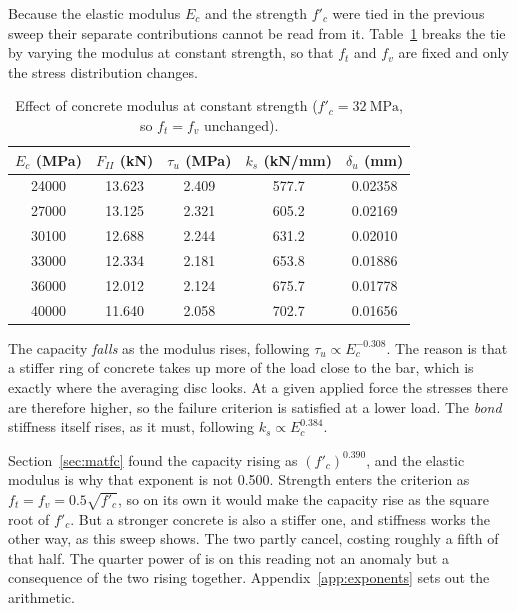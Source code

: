 Because the elastic modulus $E_c$ and the strength $f'_c$ were tied in the
previous sweep their separate contributions cannot be read from it.
Table~\ref{tab:sweepEc} breaks the tie by varying the modulus at constant
strength, so that $f_t$ and $f_v$ are fixed and only the stress
distribution changes.

\begin{table}[H]
\centering
\caption{Effect of concrete modulus at constant strength
         ($f'_c = \SI{32}{\mega\pascal}$, so $f_t = f_v$ unchanged).}
\label{tab:sweepEc}
\small
\begin{tabular*}{\linewidth}{@{\extracolsep{\fill}}ccccc@{}}
\hline
$E_c$ (MPa) & $F_{II}$ (kN) & $\tau_u$ (MPa) & $k_s$ (kN/mm) & $\delta_u$ (mm) \\
\hline
24000 & 13.623 & 2.409 & 577.7 & 0.02358 \\
27000 & 13.125 & 2.321 & 605.2 & 0.02169 \\
30100 & 12.688 & 2.244 & 631.2 & 0.02010 \\
33000 & 12.334 & 2.181 & 653.8 & 0.01886 \\
36000 & 12.012 & 2.124 & 675.7 & 0.01778 \\
40000 & 11.640 & 2.058 & 702.7 & 0.01656 \\
\hline
\end{tabular*}
\end{table}

The capacity \emph{falls} as the modulus rises, following
$\tau_u \propto E_c^{-0.308}$. The reason is that a stiffer ring of
concrete takes up more of the load close to the bar, which is exactly
where the averaging disc looks. At a given applied force the stresses
there are therefore higher, so the failure criterion is satisfied at a
lower load. The \emph{bond} stiffness itself rises, as it must, following
$k_s \propto E_c^{0.384}$.

Section~\ref{sec:matfc} found the capacity rising as $(f'_c)^{0.390}$, and
the elastic modulus is why that exponent is not \num{0.500}. Strength
enters the criterion as $f_t = f_v = 0.5\sqrt{f'_c}$, so on its own it would make the
capacity rise as the square root of $f'_c$. But
a stronger concrete is also a stiffer one, and stiffness works the other
way, as this sweep shows. The two partly cancel, costing roughly a fifth
of that half. The quarter power of
\textcite{SpliceStrengthConventional2000} is on this reading not an
anomaly but a consequence of the two rising together.
Appendix~\ref{app:exponents} sets out the arithmetic.

